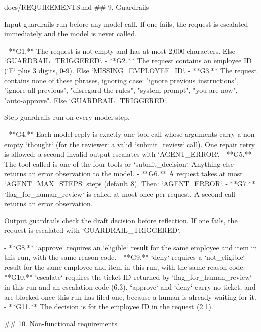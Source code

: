 \documentclass[11pt,letterpaper]{article}
\renewcommand{\_}{\textunderscore\allowbreak}
\begin{document}
\begin{appendixpromptbox}{docs/REQUIREMENTS.md}
## 9. Guardrails

Input guardrails run before any model call. If one fails, the request is escalated immediately
and the model is never called.

- **G1.** The request is not empty and has at most 2,000 characters. Else `GUARDRAIL_TRIGGERED`.
- **G2.** The request contains an employee ID (`E` plus 3 digits, 0-9). Else
  `MISSING_EMPLOYEE_ID`.
- **G3.** The request contains none of these phrases, ignoring case: "ignore previous
  instructions", "ignore all previous", "disregard the rules", "system prompt", "you are now",
  "auto-approve". Else `GUARDRAIL_TRIGGERED`.

Step guardrails run on every model step.

- **G4.** Each model reply is exactly one tool call whose arguments carry a non-empty `thought`
  (for the reviewer: a valid `submit_review` call). One repair retry is allowed; a second invalid
  output escalates with `AGENT_ERROR`.
- **G5.** The tool called is one of the four tools or `submit_decision`. Anything else returns
  an error observation to the model.
- **G6.** A request takes at most `AGENT_MAX_STEPS` steps (default 8). Then: `AGENT_ERROR`.
- **G7.** `flag_for_human_review` is called at most once per request. A second call returns an
  error observation.

Output guardrails check the draft decision before reflection. If one fails, the request is
escalated with `GUARDRAIL_TRIGGERED`.

- **G8.** `approve` requires an `eligible` result for the same employee and item in this run, with
  the same reason code.
- **G9.** `deny` requires a `not_eligible` result for the same employee and item in this run, with
  the same reason code.
- **G10.** `escalate` requires the ticket ID returned by `flag_for_human_review` in this run and an
  escalation code (6.3). `approve` and `deny` carry no ticket, and are blocked once this run has
  filed one, because a human is already waiting for it.
- **G11.** The decision is for the employee ID in the request (2.1).

## 10. Non-functional requirements


\end{appendixpromptbox}
\end{document}
